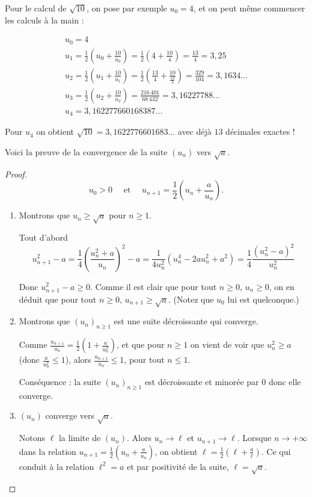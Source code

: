 \documentclass[class=report,crop=false]{standalone}
\begin{document}
Pour le calcul de $\sqrt{10}$, on pose par exemple $u_0=4$, et on peut même commencer les calculs à la main :

$$
\begin{array}{l}
  u_0 = 4     \\
  u_1 = \frac12 \left(u_0+\frac{10}{u_0}\right) = \frac12\left(4+\frac{10}{4}\right) = \frac{13}{4} = 3,25 \\
  u_2 = \frac12 \left(u_1+\frac{10}{u_1}\right) = \frac12\left(\tfrac{13}{4}+\frac{10}{\tfrac{13}{4}}\right)
  = \frac{329}{104} = 3,1634\ldots \\
  u_3 = \frac12 \left(u_2+\frac{10}{u_2}\right) = \frac{216\,401}{68\,432} = 3,16227788 \ldots \\
  u_4 = 3,162277660168387\ldots
\end{array}
$$

Pour $u_4$ on obtient $\sqrt{10} = 3,1622776601683\ldots$
avec déjà $13$ décimales exactes !

Voici la preuve de la convergence de la suite $(u_n)$ vers $\sqrt{a}$.
\begin{proof}
$$ u_0>0 \quad \text{ et } \quad u_{n+1} = \frac12 \left(u_n+\frac{a}{u_n}\right).$$
\begin{enumerate}
  \item Montrons que $u_n \ge \sqrt{a}$ pour $n\ge1$.

  Tout d'abord
  $$u_{n+1}^2-a = \frac14 \left(\frac{u_n^2 + a}{u_n}\right)^2 - a
  = \frac{1}{4u_n^2}(u_n^4-2au_n^2+a^2)=\frac14 \frac{(u_n^2-a)^2}{u_n^2}$$

  Donc $u_{n+1}^2 - a \ge 0$. Comme il est clair que pour tout $n\ge 0$, $u_{n} \ge 0$, on en déduit que pour tout $n\ge 0$, $u_{n+1} \ge \sqrt{a}$. (Notez que $u_0$ lui est quelconque.)


  \item Montrons que $(u_n)_{n\ge1}$ est une suite décroissante qui converge.

  Comme $\frac{u_{n+1}}{u_n} = \frac12 \left(1+\frac{a}{u_n^2}\right)$,
  et que pour $n\ge 1$ on vient de voir que
  $u_n^2 \ge a$ (donc $\frac{a}{u_n^2}\le 1$), alors $\frac{u_{n+1}}{u_n} \le 1$, pour tout $n\le 1$.

  Conséquence : la suite $(u_n)_{n\ge1}$ est décroissante et minorée par $0$ donc elle converge.

  \item $(u_n)$ converge vers $\sqrt{a}$.

  Notons $\ell$ la limite de $(u_n)$. Alors $u_n \to \ell$ et $u_{n+1} \to \ell$.
  Lorsque $n\to +\infty$ dans la relation $u_{n+1} = \frac12 \left(u_n+\frac{a}{u_n}\right)$, on obtient
  $\ell = \frac12 \left(\ell+\frac{a}{\ell}\right)$. Ce qui conduit à la relation $\ell^2=a$ et par positivité de la suite, $\ell = \sqrt{a}$.
\end{enumerate}

\end{proof}
\end{document}
